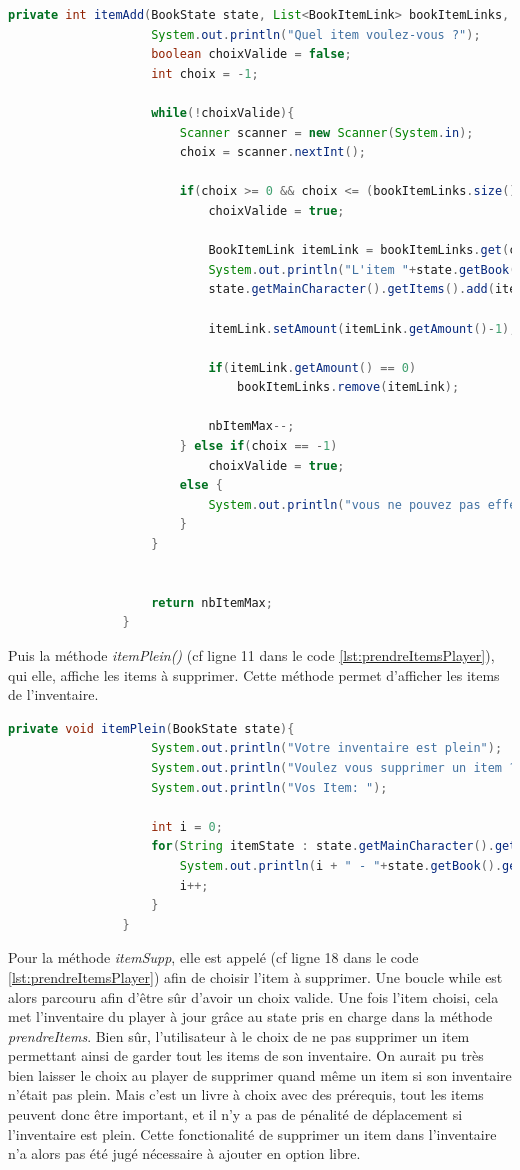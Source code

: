 			\begin{lstlisting}[gobble=16, language=java, caption=itemAdd()]
				private int itemAdd(BookState state, List<BookItemLink> bookItemLinks, int nbItemMax){
					System.out.println("Quel item voulez-vous ?");
					boolean choixValide = false;
					int choix = -1;

					while(!choixValide){
						Scanner scanner = new Scanner(System.in);
						choix = scanner.nextInt();

						if(choix >= 0 && choix <= (bookItemLinks.size()-1)){
							choixValide = true;

							BookItemLink itemLink = bookItemLinks.get(choix);
							System.out.println("L'item "+state.getBook().getItems().get(itemLink.getId()).getName()+" a été rajouté");
							state.getMainCharacter().getItems().add(itemLink.getId());

							itemLink.setAmount(itemLink.getAmount()-1);

							if(itemLink.getAmount() == 0)
								bookItemLinks.remove(itemLink);

							nbItemMax--;
						} else if(choix == -1)
							choixValide = true;
						else {
							System.out.println("vous ne pouvez pas effectuer ce choix");
						}
					}


					return nbItemMax;
				}
			\end{lstlisting}

			Puis la méthode \textit{itemPlein()} (cf ligne 11 dans le code \ref{lst:prendreItemsPlayer}), qui elle, affiche les items à supprimer. Cette méthode permet d'afficher les items de l'inventaire.

			\begin{lstlisting}[gobble=16, language=java, caption=itemPlein()]
				private void itemPlein(BookState state){
					System.out.println("Votre inventaire est plein");
					System.out.println("Voulez vous supprimer un item ?");
					System.out.println("Vos Item: ");

					int i = 0;
					for(String itemState : state.getMainCharacter().getItems()){
						System.out.println(i + " - "+state.getBook().getItems().get(itemState));
						i++;
					}
				}
			\end{lstlisting}

			Pour la méthode \textit{itemSupp}, elle est appelé (cf ligne 18 dans le code \ref{lst:prendreItemsPlayer}) afin de choisir l'item à supprimer. Une boucle while est alors parcouru afin d'être sûr d'avoir un choix valide. Une fois l'item choisi, cela met l'inventaire du player à jour grâce au state pris en charge dans la méthode \textit{prendreItems}. Bien sûr, l'utilisateur à le choix de ne pas supprimer un item permettant ainsi de garder tout les items de son inventaire.
			On aurait pu très bien laisser le choix au player de supprimer quand même un item si son inventaire n'était pas plein. Mais c'est un livre à choix avec des prérequis, tout les items peuvent donc être important, et il n'y a pas de pénalité de déplacement si l'inventaire est plein. Cette fonctionalité de supprimer un item dans l'inventaire n'a alors pas été jugé nécessaire à ajouter en option libre.

